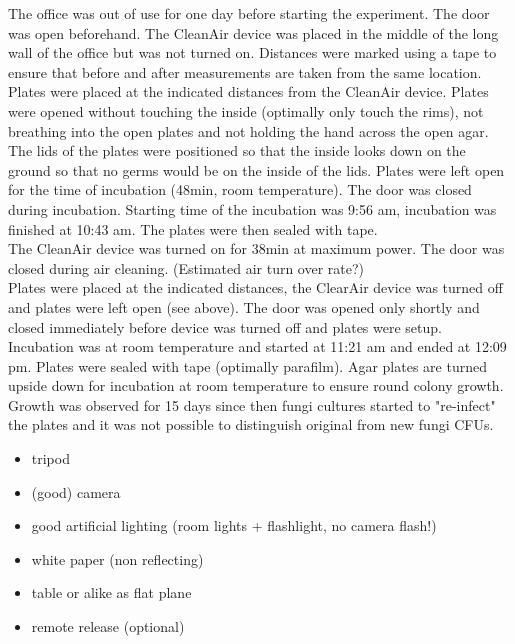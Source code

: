 \documentclass[hyperref]{labbook}
\begin{document}
The office was out of use for one day before starting the experiment. The door was open beforehand. The CleanAir device was placed in the middle of the long wall of the office but was not turned on. Distances were marked using a tape to ensure that before and after measurements are taken from the same location. Plates were placed at the indicated distances from the CleanAir device. Plates were opened without touching the inside (optimally only touch the rims), not breathing into the open plates and not holding the hand across the open agar. The lids of the plates were positioned so that the inside looks down on the ground so that no germs would be on the inside of the lids. Plates were left open for the time of incubation (48min, room temperature). The door was closed during incubation. Starting time of the incubation was 9:56 am, incubation was finished at 10:43 am. The plates were then sealed with tape.\\
The CleanAir device was turned on for 38min at maximum power. The door was closed during air cleaning. (Estimated air turn over rate?)\\
Plates were placed at the indicated distances, the ClearAir device was turned off and plates were left open (see above). The door was opened only shortly and closed immediately before device was turned off and plates were setup. Incubation was at room temperature and started at 11:21 am and ended at 12:09 pm. Plates were sealed with tape (optimally parafilm). Agar plates are turned upside down for incubation at room temperature to ensure round colony growth. Growth was observed for 15 days since then fungi cultures started to "re-infect" the plates and it was not possible to distinguish original from new fungi CFUs.\\
\begin{itemize}
\item tripod
\item (good) camera
\item good artificial lighting (room lights + flashlight, no camera flash!)
\item white paper (non reflecting)
\item table or alike as flat plane
\item remote release (optional)
\end{itemize}
\end{document}
